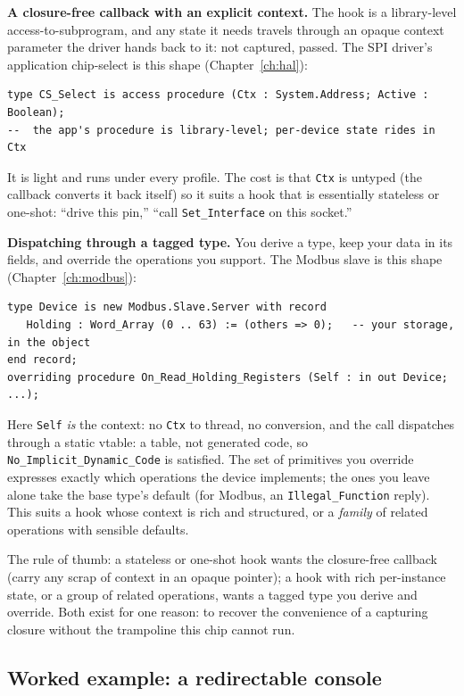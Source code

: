 \textbf{A closure-free callback with an explicit context.} The hook is a
library-level access-to-subprogram, and any state it needs travels through an
opaque context parameter the driver hands back to it: not captured, passed. The
SPI driver's application chip-select is this shape (Chapter~\ref{ch:hal}):

\begin{lstlisting}
type CS_Select is access procedure (Ctx : System.Address; Active : Boolean);
--  the app's procedure is library-level; per-device state rides in Ctx
\end{lstlisting}

It is light and runs under every profile. The cost is that \texttt{Ctx} is
untyped (the callback converts it back itself) so it suits a hook that is
essentially stateless or one-shot: ``drive this pin,'' ``call \texttt{Set\_Interface}
on this socket.''

\textbf{Dispatching through a tagged type.} You derive a type, keep your data in
its fields, and override the operations you support. The Modbus slave is this
shape (Chapter~\ref{ch:modbus}):

\begin{lstlisting}
type Device is new Modbus.Slave.Server with record
   Holding : Word_Array (0 .. 63) := (others => 0);   -- your storage, in the object
end record;
overriding procedure On_Read_Holding_Registers (Self : in out Device; ...);
\end{lstlisting}

Here \texttt{Self} \emph{is} the context: no \texttt{Ctx} to thread, no conversion,
and the call dispatches through a static vtable: a table, not generated code, so
\texttt{No\_Implicit\_Dynamic\_Code} is satisfied. The set of primitives you
override expresses exactly which operations the device implements; the ones you
leave alone take the base type's default (for Modbus, an \texttt{Illegal\_Function}
reply). This suits a hook whose context is rich and structured, or a \emph{family}
of related operations with sensible defaults.

The rule of thumb: a stateless or one-shot hook wants the closure-free callback
(carry any scrap of context in an opaque pointer); a hook with rich per-instance
state, or a group of related operations, wants a tagged type you derive and
override. Both exist for one reason: to recover the convenience of a capturing
closure without the trampoline this chip cannot run.

\subsection{Worked example: a redirectable console}
\label{driver:console-mux}

